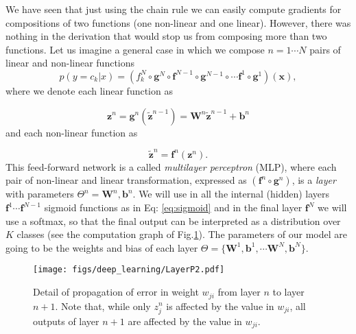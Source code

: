 We have seen that just using the chain rule we can easily compute gradients for
compositions of two functions (one non-linear and one linear). However, there
was nothing in the derivation that would stop us from composing more than two
functions. 
Let us imagine a general case in which we compose $n=1 \cdots N$
pairs of linear and non-linear functions 
%
\begin{equation}
p(y=c_k|{x}) = (f_k^N \circ \mathbf{g}^N \circ \mathbf{f}^{N-1} \circ \mathbf{g}^{N-1} \circ \cdots \mathbf{f}^1 \circ \mathbf{g}^1)(\mathbf{x}),
\label{eq:FeedForward}
\end{equation}
%
\noindent where we denote each linear function as

\begin{equation}
\mathbf{z}^n = \mathbf{g}^n(\tilde{\mathbf{z}}^{n-1}) = \mathbf{W}^n \tilde{\mathbf{z}}^{n-1} + \mathbf{b}^n 
\end{equation}
%
\noindent and each non-linear function as 

\begin{equation}
\tilde{\mathbf{z}}^n = \mathbf{f}^n(\mathbf{z}^n).
\end{equation}
%
This feed-forward network is a called \textit{multilayer perceptron} (MLP), where each pair of non-linear and linear transformation, expressed as $(\mathbf{f}^n \circ \mathbf{g}^n)$, is a \textit{layer} with parameters $\Theta^n={\mathbf{W}^n, \mathbf{b}^n}$. We will use in all the internal (hidden) layers $\mathbf{f}^1 \cdots \mathbf{f}^{N-1}$ sigmoid functions as in Eq:
\ref{eq:sigmoid} and in the final layer $\mathbf{f}^N$ we will use a softmax, so that the final output
can be interpreted as a distribution over $K$ classes (see the computation graph of Fig.\ref{fig:LayerP2}). The parameters of our
model are going to be the weights and bias of each layer
$\Theta=\{\mathbf{W}^1, \mathbf{b}^1, \cdots \mathbf{W}^N, \mathbf{b}^N\}$.

\begin{figure}
\centering
\texttt{[image: figs/deep\_learning/LayerP2.pdf]}
\caption{Detail of propagation of error in weight $w_{ji}$ from layer $n$ to
layer $n+1$. Note that, while only $z_j^n$ is affected by the value in $w_{ji}$, all outputs
of layer $n+1$ are affected by the value in $w_{ji}$.
}
\label{fig:LayerP2}
\end{figure}

